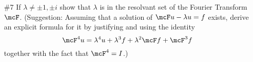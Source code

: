 \documentclass[11pt, oneside]{article}
\begin{document}
\begin{enumerate}
\begin{enumerate}
\begin{proof}
          In conclusion this shows for part (b) that
          \[
            \set{\lambda \in \CC: \abs{\lambda} = 1} = \sigma_c(S_+)
          \]
          and for part (c) that
          \[
            \set{\lambda \in \CC: \abs{\lambda} < 1} = \sigma_c(S_+).
          \]
        \end{proof}
    \end{enumerate}

  \pagebreak
  \item[\#7] %
    If $\lambda \neq \pm 1, \pm i$ show that $\lambda$ is in the resolvant set
    of the Fourier Transform $\mcF$.
    (Suggestion: Assuming that a solution of $\mcF u - \lambda u = f$ exists,
    derive an explicit formula for it by justifying and using the identity
    \[
      \mcF^4 u = \lambda^4 u + \lambda^3 f + \lambda^2 \mcF f + \mcF^3 f
    \]
    together with the fact that $\mcF^4 = I$.)


\end{enumerate}
\end{document}
